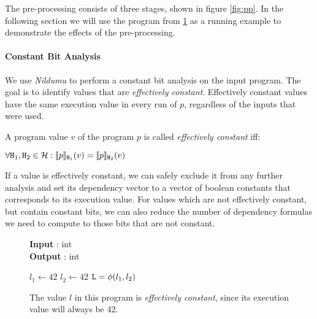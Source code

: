 The pre-processing consists of three stages, shown in figure \ref{fig:pp}. In the following section we will use the program from \ref{fig:ec} as a running example to demonstrate the effects of the pre-processing.

\paragraph{Constant Bit Analysis}
We use \emph{Nildumu} \cite{bechberger18} to perform a constant bit analysis on the input program. The goal is to identify values that are \emph{effectively constant}. Effectively constant values have the same execution value in every run of $p$, regardless of the inputs that were used.

\begin{definition}
    A program value $v$ of the program $p$ is called \emph{effectively constant} iff:
    \begin{center}
        $\forall \mathtt{H}_1, \mathtt{H}_2 \in \mathcal{H}: \llbracket p \rrbracket_{\mathtt{H}_1} (v) = \llbracket p \rrbracket_{\mathtt{H}_2}(v)$
    \end{center}
\end{definition}

If a value is effectively constant, we can safely exclude it from any further analysis and set its dependency vector to a vector of boolean constants that corresponds to its execution value. For values which are not effectively constant, but contain constant bits, we can also reduce the number of dependency formulas we need to compute to those bits that are not constant.


\begin{figure}
    \centering
    \begin{minipage}{.7\linewidth}
        \begin{algorithm}[H]
            \hspace*{\algorithmicindent} \textbf{Input} \In: int \\
            \hspace*{\algorithmicindent} \textbf{Output} \Out: int \\
            \hspace{1em}
            \begin{algorithmic}[1]
                \State $l_1 \leftarrow 42$
                \Else
                \State $l_2 \leftarrow 42$
                \EndIf
                \State $\mathtt{L} = \phi(l_1, l_2)$
            \end{algorithmic}
        \end{algorithm}
    \end{minipage}
    \caption{The value $l$ in this program is \emph{effectively constant}, since its execution value will always be 42.}
    \label{fig:ec}
\end{figure}

